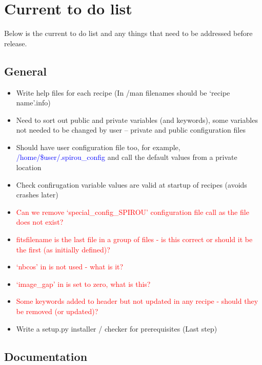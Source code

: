 \chapter{Current to do list}
\label{ch:todo}

Below is the current to do list and any things that need to be addressed before release.

\section{General}
\label{ch:todo:general}

\begin{itemize}
	\item Write help files for each recipe (In \InstallDIR/man filenames should be `recipe name'.info)
	\item Need to sort out public and private variables (and keywords), some variables not needed to be changed by user -- private and public configuration files
	\item Should have user configuration file too, for example, \textcolor{blue}{/home/\$user/.spirou\_config} and call the default values from a private location
	\item Check confirugation variable values are valid at startup of recipes (avoids crashes later)
	\item \textcolor{red}{Can we remove `special\_config\_SPIROU' configuration file call as the file does not exist?}
	\item \textcolor{red}{fitsfilename is the last file in a group of files - is this correct or should it be the first (as initially defined)?}
	\item \textcolor{red}{`nbcos' in \spirouImage is not used - what is it?}
	\item \textcolor{red}{`image\_gap' in \spirouLOCOR is set to zero, what is this?}
	\item \textcolor{red}{Some keywords added to header but not updated in any recipe - should they be removed (or updated)?}
	\item Write a setup.py installer / checker for prerequisites (Last step)
\end{itemize}

\section{Documentation}
\label{ch:todo:documentation}

